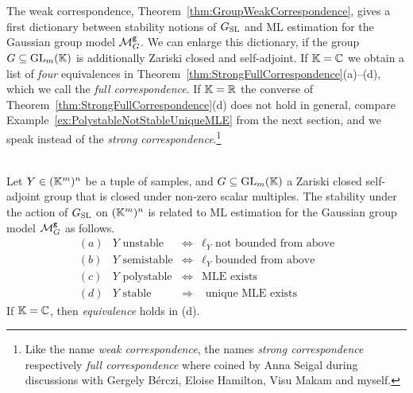 The weak correspondence, Theorem~\ref{thm:GroupWeakCorrespondence}, gives a first dictionary between stability notions of $G_{\operatorname{SL}}$ and ML estimation for the Gaussian group model $\mathcal{M}^{\mathtt{g}}_G$. We can enlarge this dictionary, if the group $G \subseteq \operatorname{GL}_m(\mathbb K)$ is additionally Zariski closed and self-adjoint. If $\mathbb K = \mathbb C$ we obtain a list of \emph{four} equivalences in Theorem~\ref{thm:StrongFullCorrespondence}(a)--(d), which we call the \emph{full correspondence}. If $\mathbb K = \mathbb R$ the converse of Theorem~\ref{thm:StrongFullCorrespondence}(d) does not hold in general, compare Example~\ref{ex:PolystableNotStableUniqueMLE} from the next section, and we speak instead of the \emph{strong correspondence}.\footnote{Like the name \emph{weak correspondence}, the names \emph{strong correspondence} respectively \emph{full correspondence} where coined by Anna Seigal during discussions with Gergely B\'erczi, Eloise Hamilton, Visu Makam and myself.}

\begin{theorem} \label{thm:StrongFullCorrespondence}
	\ \\
	Let $Y \in (\mathbb K^m)^n$ be a tuple of samples, and $G \subseteq \operatorname{GL}_m(\mathbb K)$ a Zariski closed self-adjoint group that is closed under non-zero scalar multiples. The stability under the action of $G_{\operatorname{SL}}$ on $(\mathbb K^m)^n$ is related to ML estimation for the Gaussian group model $\mathcal{M}^{\mathtt{g}}_G$ as follows.
	\[ \begin{matrix}
		(a) & Y \text{ unstable} & \Leftrightarrow & \ell_Y \text{ not bounded from above} \\
		(b) & Y \text{ semistable} & \Leftrightarrow & \ell_Y \text{  bounded from above} \\ 
		(c) & Y \text{ polystable} & \Leftrightarrow & \text{MLE exists}	\\
		(d) & Y \text{ stable} & \Rightarrow & \text{ unique MLE exists} 
	\end{matrix}
	\]
	If $\mathbb K = \mathbb C$, then \emph{equivalence} holds in (d).
\end{theorem}

